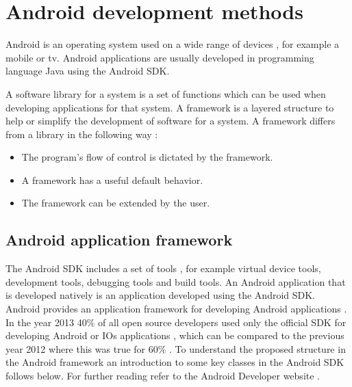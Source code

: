 \section{Android development methods}\label{sec:android-development-methods}
Android is an operating system used on a wide range of devices \cite{dell2011}, for example a mobile or tv. Android applications are usually developed in programming language Java using the Android SDK.

A software library for a system is a set of functions which can be used when developing applications for that system. A framework is a layered structure to help or simplify the development of software for a system. A framework differs from a library in the following way \cite{riehle2000}:

\begin{itemize}
\item The program's flow of control is dictated by the framework.
\item A framework has a useful default behavior.
\item The framework can be extended by the user.
\end{itemize}

\subsection{Android application framework} \label{subsec:android-application-framework}
The Android SDK includes a set of tools \cite{sdk2015}, for example virtual device tools, development tools, debugging tools and build tools. An Android application that is developed natively is an application developed using the Android SDK. Android provides an application framework for developing Android applications \cite{android-framework2015}. In the year 2013 40\% of all open source developers used only the official SDK for developing Android or IOs applications \cite{eclipse2013}, which can be compared to the previous year 2012 where this was true for 60\% \cite{eclipse2012}. To understand the proposed structure in the Android framework an introduction to some key classes in the Android SDK follows below. For further reading refer to the Android Developer website \cite{androiddevelopers2015}.

